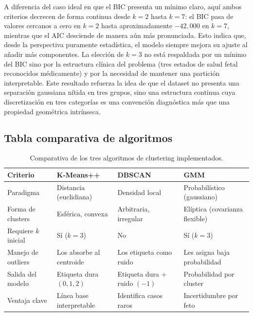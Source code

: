 \documentclass[12pt,letterpaper]{article}
\begin{document}
A diferencia del caso ideal en que el BIC presenta un mínimo claro, aquí ambos criterios
decrecen de forma continua desde $k=2$ hasta $k=7$: el BIC pasa de valores cercanos a
cero en $k=2$ hasta aproximadamente $-42{,}000$ en $k=7$, mientras que el AIC desciende
de manera aún más pronunciada. Esto indica que, desde la perspectiva puramente estadística,
el modelo siempre mejora su ajuste al añadir más componentes. La elección de $k=3$
no está respaldada por un mínimo del BIC sino por la estructura clínica del problema
(tres estados de salud fetal reconocidos médicamente) y por la necesidad de mantener
una partición interpretable. Este resultado refuerza la idea de que el dataset no presenta
una separación gaussiana nítida en tres grupos, sino una estructura continua cuya
discretización en tres categorías es una convención diagnóstica más que una propiedad
geométrica intrínseca.

\subsection{Tabla comparativa de algoritmos}

\begin{table}[H]
\centering
\caption{Comparativa de los tres algoritmos de clustering implementados.}
\label{tab:comparativa_algos}
\footnotesize
\begin{tabular}{p{2.8cm}p{3.0cm}p{3.0cm}p{3.0cm}}
\toprule
\rowcolor{headbg}
\textbf{Criterio} & \textbf{K-Means++} & \textbf{DBSCAN} & \textbf{GMM} \\
\midrule
Paradigma             & Distancia (euclidiana) & Densidad local & Probabilístico (gaussiano) \\
Forma de clusters     & Esférica, convexa & Arbitraria, irregular & Elíptica (covarianza flexible) \\
Requiere $k$ inicial  & Sí ($k=3$) & No & Sí ($k=3$) \\
Manejo de outliers    & Los absorbe al centroide & Los etiqueta como ruido & Les asigna baja probabilidad \\
Salida del modelo     & Etiqueta dura $(0,1,2)$ & Etiqueta dura + ruido $(-1)$ & Probabilidad por cluster \\
Ventaja clave         & Línea base interpretable & Identifica casos raros & Incertidumbre por feto \\
\bottomrule
\end{tabular}
\end{table}

\end{document}
